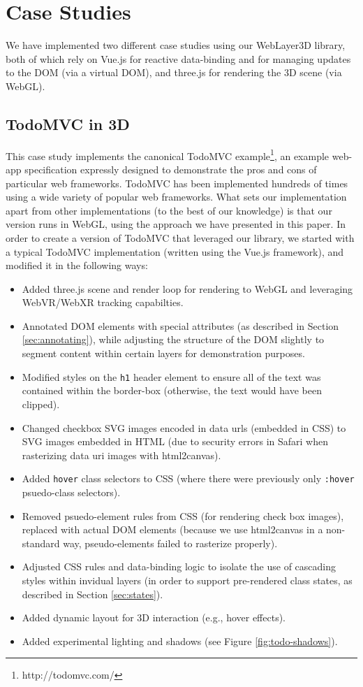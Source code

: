 \documentclass[sigconf]{acmart}
\begin{document}
\section{Case Studies}

We have implemented two different case studies using our WebLayer3D library, both of which rely on Vue.js for reactive data-binding and for managing updates to the DOM (via a virtual DOM), and three.js for rendering the 3D scene (via WebGL). 

\subsection{TodoMVC in 3D}
This case study implements the canonical TodoMVC example\footnote{http://todomvc.com/}, an example web-app specification expressly designed to demonstrate the pros and cons of particular web frameworks.  TodoMVC has been implemented hundreds of times using a wide variety of popular web frameworks. What sets our implementation apart from other implementations (to the best of our knowledge) is that our version runs in WebGL, using the approach we have presented in this paper. In order to create a version of TodoMVC that leveraged our library, we started with a typical TodoMVC implementation (written using the Vue.js framework), and modified it in the following ways:
\begin{itemize}
\item Added three.js scene and render loop for rendering to WebGL and leveraging WebVR/WebXR tracking capabilties. 
\item Annotated DOM elements with special attributes (as described in Section \ref{sec:annotating}), while adjusting the structure of the DOM slightly to segment content within certain layers for demonstration purposes. 
\item Modified styles on the \verb|h1| header element to ensure all of the text was contained within the border-box (otherwise, the text would have been clipped). 
\item Changed checkbox SVG images encoded in data urls (embedded in CSS) to SVG images embedded in HTML (due to security errors in Safari when rasterizing data uri images with html2canvas).
\item Added \verb|hover| class selectors to CSS (where there were previously only \verb|:hover| psuedo-class selectors).
\item Removed psuedo-element rules from CSS (for rendering check box images), replaced with actual DOM elements (because we use html2canvas in a non-standard way, pseudo-elements failed to rasterize properly).
\item Adjusted CSS rules and data-binding logic to isolate the use of cascading styles within invidual layers (in order to support pre-rendered class states, as described in Section \ref{sec:states}).
\item Added dynamic layout for 3D interaction (e.g., hover effects).
\item Added experimental lighting and shadows (see Figure \ref{fig:todo-shadows}).
\end{itemize}
\end{document}
